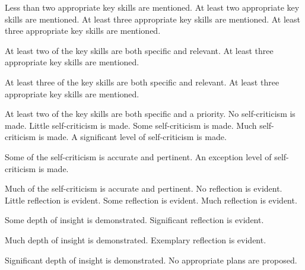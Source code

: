 \documentclass{../fal_assignment}
\begin{document}
\begin{markingrubric}
%
%
        \grade\fail 	Less than two appropriate key skills are mentioned.
        \grade 		At least two appropriate key skills are mentioned.
        \grade 		At least three appropriate key skills are mentioned.
        \grade 		At least three appropriate key skills are mentioned.
        \par 		At least two of the key skills are both specific and relevant.
        \grade 		At least three appropriate key skills are mentioned.
        \par 		At least three of the key skills are both specific and relevant.
        \grade 		At least three appropriate key skills are mentioned.
        \par 		At least two of the key skills are both specific and a priority.
%
        \grade\fail 	No self-criticism is made.
        \grade 		Little self-criticism is made.
        \grade 		Some self-criticism is made.
        \grade 		Much self-criticism is made.
        \grade 		A significant level of self-criticism is made.
            \par 		Some of the self-criticism is accurate and pertinent.
        \grade 		An exception level of self-criticism is made.
            \par 		Much of the self-criticism is accurate and pertinent.
%
        \grade\fail 	No reflection is evident.
        \grade 		Little reflection is evident.
        \grade 		Some reflection is evident.
        \grade 		Much reflection is evident.
        \par 		Some depth of insight is demonstrated.
        \grade 		Significant reflection is evident.
        \par 		Much depth of insight is demonstrated.
        \grade 		Exemplary reflection is evident.
        \par 		Significant depth of insight is demonstrated.
%
        \grade\fail 	No appropriate plans are proposed.

\end{markingrubric}
\end{document}
